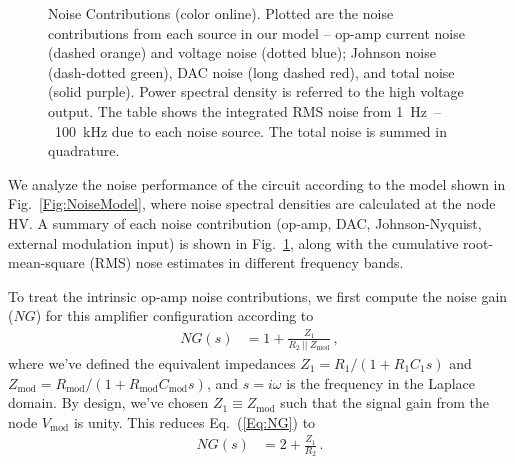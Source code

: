 \documentclass[aip,rsi,preprint,graphicx]{revtex4-1} %
\newcommand{\epar}{~||~} %
\begin{document}
\begin{figure}[t]

\caption{Noise Contributions (color online).  Plotted are the noise contributions from each source in our model -- op-amp current noise (dashed orange) and voltage noise (dotted blue); Johnson noise (dash-dotted green), DAC noise (long dashed red), and total noise (solid purple). Power spectral density is referred to the high voltage output. The table shows the integrated RMS noise from \SI{1}{\hertz}~--~\SI{100}{\kilo\hertz} due to each noise source. The total noise is summed in quadrature.\label{Fig:NoisePlot}}
\end{figure}

We analyze the noise performance of the circuit according to the model shown in Fig.~\ref{Fig:NoiseModel}, where noise spectral densities are calculated at the node HV.
A summary of each noise contribution (op-amp, DAC, Johnson-Nyquist, external modulation input) is shown in Fig.~\ref{Fig:NoisePlot}, along with the cumulative root-mean-square (RMS) nose estimates in different frequency bands.

To treat the intrinsic op-amp noise contributions, we first compute the noise gain ($NG$) for this amplifier configuration according to
\begin{align}
\label{Eq:NG}
NG(s) &= 1 + \frac{Z_1}{R_2 \epar Z_{\text{mod}}}\,,
\end{align}
where we've defined the equivalent impedances $Z_1 = R_1/(1+R_1 C_1 s)$ and $Z_{\text{mod}} = R_{\text{mod}}/(1+R_{\text{mod}} C_{\text{mod}} s)$, and $s = i\omega$ is the frequency in the Laplace domain.
By design, we've chosen $Z_1 \equiv Z_{\text{mod}}$ such that the signal gain from the node $V_{\text{mod}}$ is unity.
This reduces Eq.~(\ref{Eq:NG}) to
\begin{align}
\label{Eq:RedNG}
NG(s) &= 2 + \frac{Z_1}{R_2}\,.
\end{align}
\end{document}
